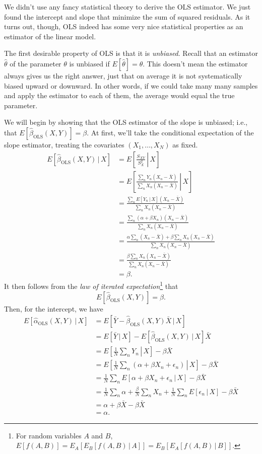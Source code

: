 \documentclass[
  12pt,
  oneside,openany]{book}
\begin{document}
We didn't use any fancy statistical theory to derive the OLS estimator. We just found the intercept and slope that minimize the sum of squared residuals. As it turns out, though, OLS indeed has some very nice statistical properties as an estimator of the linear model.

The first desirable property of OLS is that it is \emph{unbiased}. Recall that an estimator \(\hat{\theta}\) of the parameter \(\theta\) is unbiased if \(E[\hat{\theta}] = \theta\). This doesn't mean the estimator always gives us the right answer, just that on average it is not systematically biased upward or downward. In other words, if we could take many many samples and apply the estimator to each of them, the average would equal the true parameter.

We will begin by showing that the OLS estimator of the slope is unbiased; i.e., that \(E[\hat{\beta}_{\text{OLS}}(X, Y)] = \beta\). At first, we'll take the conditional expectation of the slope estimator, treating the covariates \((X_1, \ldots, X_N)\) as fixed.
\[
\begin{aligned}
E[\hat{\beta}_{\text{OLS}}(X, Y) \,|\, X]
&= E \left[ \left. \frac{S_{XY}}{S_X^2} \,\right|\, X \right] \\
&= E \left[ \left. \frac{\sum_n Y_n (X_n - \bar{X})}{\sum_n X_n (X_n - \bar{X})} \,\right|\, X \right] \\
&= \frac{\sum_n E[Y_n \,|\, X] (X_n - \bar{X})}{\sum_n X_n (X_n - \bar{X})} \\
&= \frac{\sum_n (\alpha + \beta X_n) (X_n - \bar{X})}{\sum_n X_n (X_n - \bar{X})} \\
&= \frac{\alpha \sum_n (X_n - \bar{X}) + \beta \sum_n X_n (X_n - \bar{X})}{\sum_n X_n (X_n - \bar{X})} \\
&= \frac{\beta \sum_n X_n (X_n - \bar{X})}{\sum_n X_n (X_n - \bar{X})} \\
&= \beta.
\end{aligned}
\]
It then follows from the \emph{law of iterated expectation}\footnote{For random variables \(A\) and \(B\), \(E[f(A, B)] = E_A[ E_B[f(A, B) \,|\, A] ] = E_B [ E_A[f(A, B) \,|\, B] ]\).} that
\[
E[\hat{\beta}_{\text{OLS}}(X, Y)] = \beta.
\]
Then, for the intercept, we have
\[
\begin{aligned}
E[\hat{\alpha}_{\text{OLS}}(X, Y) \,|\, X]
&= E [\bar{Y} - \hat{\beta}_{\text{OLS}}(X, Y) \bar{X} \,|\, X] \\
&= E [\bar{Y} \,|\, X] - E[\hat{\beta}_{\text{OLS}}(X, Y) \,|\, X] \bar{X} \\
&= E \left[ \left. \frac{1}{N} \sum_n Y_n \,\right|\, X \right] - \beta \bar{X} \\
&= E \left[ \left. \frac{1}{N} \sum_n (\alpha + \beta X_n + \epsilon_n) \,\right|\, X \right] - \beta \bar{X} \\
&= \frac{1}{N} \sum_n E[\alpha + \beta X_n + \epsilon_n \,|\, X] - \beta \bar{X} \\
&= \frac{1}{N} \sum_n \alpha + \frac{\beta}{N} \sum_n X_n + \frac{1}{N} \sum_n E[\epsilon_n \,|\, X] - \beta \bar{X} \\
&= \alpha + \beta \bar{X} - \beta \bar{X} \\
&= \alpha.
\end{aligned}
\]
\end{document}

